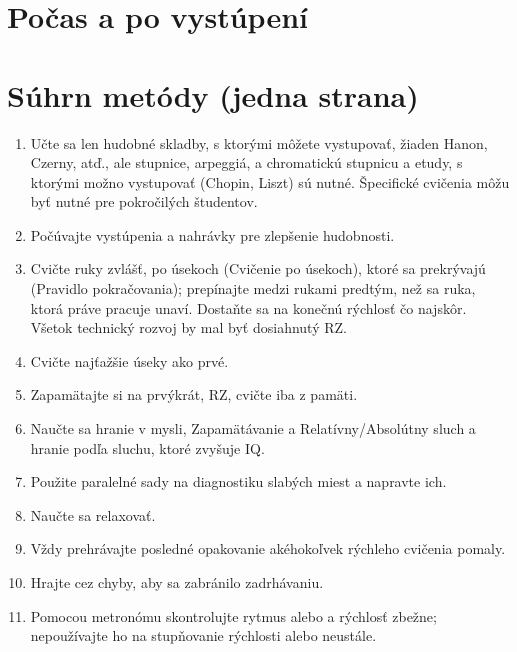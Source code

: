 \documentclass[11pt,a4paper]{book}
\begin{document}
\section{Počas a po vystúpení}\label{s:during-performance}

\newpage
\section{Súhrn metódy (jedna strana)}\label{s:summary-method}
\begin{enumerate}
\item Učte sa len hudobné skladby, s ktorými môžete vystupovať, žiaden Hanon, Czerny, atď., ale stupnice, arpeggiá, a chromatickú stupnicu a etudy, s ktorými možno vystupovať (Chopin, Liszt) sú nutné. Špecifické cvičenia môžu byť nutné pre pokročilých študentov.

\item Počúvajte vystúpenia a nahrávky pre zlepšenie hudobnosti.

\item Cvičte ruky zvlášť, po úsekoch (Cvičenie po úsekoch), ktoré sa prekrývajú (Pravidlo pokračovania); prepínajte medzi rukami predtým, než sa ruka, ktorá práve pracuje unaví. Dostaňte sa na konečnú rýchlosť čo najskôr. Všetok technický rozvoj by mal byť dosiahnutý RZ.

\item Cvičte najťažšie úseky ako prvé.

\item Zapamätajte si na prvýkrát, RZ, cvičte iba z pamäti.

\item Naučte sa hranie v mysli, Zapamätávanie a Relatívny/Absolútny sluch a hranie podľa sluchu, ktoré zvyšuje IQ.

\item Použite paralelné sady na diagnostiku slabých miest a napravte ich.

\item Naučte sa relaxovať.

\item Vždy prehrávajte posledné opakovanie akéhokoľvek rýchleho cvičenia pomaly.

\item Hrajte cez chyby, aby sa zabránilo zadrhávaniu.

\item Pomocou metronómu skontrolujte rytmus alebo a rýchlosť zbežne; nepoužívajte ho na stupňovanie rýchlosti alebo neustále.


\end{enumerate}
\end{document}
